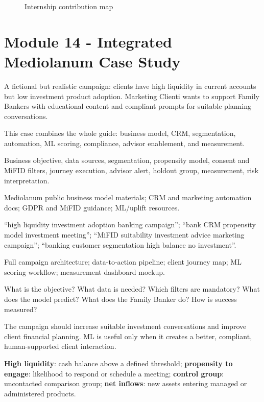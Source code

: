 \documentclass[
	11pt,
	fleqn,
	a4paper,
	oneside,
]{LegrandOrangeBook}
\newcommand{\moduleblock}[9]{%
	\begin{description}[leftmargin=3.4cm, style=nextline, font=\sffamily\bfseries]
		\item[What it is] #1
		\item[Why it matters] #2
		\item[Key concepts] #3
		\item[Resources to find] #4
		\item[Search queries] #5
		\item[Diagrams] #6
		\item[Practical questions] #7
		\item[Mini case] #8
		\item[Key terms] #9
	\end{description}
}
\newcommand{\term}[2]{\textbf{#1}: #2}
\begin{document}
\begin{figure}[H]
	\centering
	\caption{Internship contribution map}
\end{figure}

\section{Module 14 - Integrated Mediolanum Case Study}

\moduleblock
{A fictional but realistic campaign: clients have high liquidity in current accounts but low investment product adoption. Marketing Clienti wants to support Family Bankers with educational content and compliant prompts for suitable planning conversations.}
{This case combines the whole guide: business model, CRM, segmentation, automation, ML scoring, compliance, advisor enablement, and measurement.}
{Business objective, data sources, segmentation, propensity model, consent and MiFID filters, journey execution, advisor alert, holdout group, measurement, risk interpretation.}
{Mediolanum public business model materials; CRM and marketing automation docs; GDPR and MiFID guidance; ML/uplift resources.}
{``high liquidity investment adoption banking campaign''; ``bank CRM propensity model investment meeting''; ``MiFID suitability investment advice marketing campaign''; ``banking customer segmentation high balance no investment''.}
{Full campaign architecture; data-to-action pipeline; client journey map; ML scoring workflow; measurement dashboard mockup.}
{What is the objective? What data is needed? Which filters are mandatory? What does the model predict? What does the Family Banker do? How is success measured?}
{The campaign should increase suitable investment conversations and improve client financial planning. ML is useful only when it creates a better, compliant, human-supported client interaction.}
{\term{High liquidity}{cash balance above a defined threshold}; \term{propensity to engage}{likelihood to respond or schedule a meeting}; \term{control group}{uncontacted comparison group}; \term{net inflows}{new assets entering managed or administered products}.}
\end{document}

